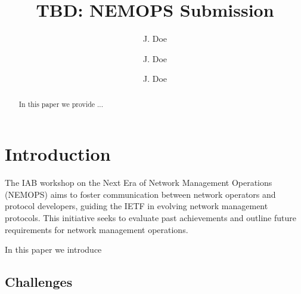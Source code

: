 \documentclass[11pt,sigconf]{iabart}
\begin{document}
\title{TBD: NEMOPS Submission}


\author{J. Doe}

\author{J. Doe}

\author{J. Doe}

\begin{abstract}

In this paper we provide ...

\end{abstract}


\maketitle

\section{Introduction} \label{introduction}

The IAB workshop on the Next Era of Network Management Operations (NEMOPS) aims to foster communication between network operators and protocol developers, guiding the IETF in evolving network management protocols. This initiative seeks to evaluate past achievements and outline future requirements for network management operations.

In this paper we introduce 


\subsection{Challenges} \label{introduction}

\end{document}
